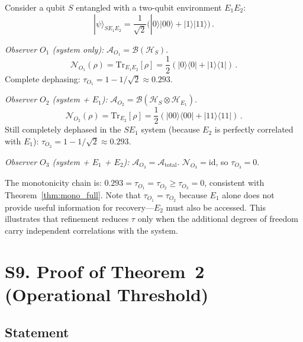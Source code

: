 \documentclass[aps,prd,preprint,superscriptaddress,longbibliography]{revtex4-2}
\newcommand{\Tr}{\mathrm{Tr}}
\newcommand{\id}{\mathrm{id}}
\newcommand{\chan}{\mathcal{N}}
\newcommand{\hilb}{\mathcal{H}}
\newcommand{\ket}[1]{|#1\rangle}
\newcommand{\op}[2]{|#1\rangle\langle#2|}
\newcommand{\tauasym}{\tau}
\newcommand{\algO}{\mathcal{A}}
\begin{document}
Consider a qubit $S$ entangled with a two-qubit environment $E_1 E_2$:
\begin{equation}
  \ket{\psi}_{S E_1 E_2} = \frac{1}{\sqrt{2}}
  \big(\ket{0}\ket{00} + \ket{1}\ket{11}\big)\,.
  \label{eq:example_state}
\end{equation}

\emph{Observer $O_1$ (system only):}
$\algO_{O_1} = \mathcal{B}(\hilb_S)$.
\begin{equation}
  \chan_{O_1}(\rho) = \Tr_{E_1 E_2}[\rho]
  = \frac{1}{2}(\op{0}{0} + \op{1}{1})\,.
  \label{eq:O1_channel}
\end{equation}
Complete dephasing: $\tauasym_{O_1} = 1 - 1/\sqrt{2} \approx 0.293$.

\emph{Observer $O_2$ (system + $E_1$):}
$\algO_{O_2} = \mathcal{B}(\hilb_S \otimes \hilb_{E_1})$.
\begin{equation}
  \chan_{O_2}(\rho) = \Tr_{E_2}[\rho]
  = \frac{1}{2}(\op{00}{00} + \op{11}{11})\,.
  \label{eq:O2_channel}
\end{equation}
Still completely dephased in the $S E_1$ system (because $E_2$ is
perfectly correlated with $E_1$):
$\tauasym_{O_2} = 1 - 1/\sqrt{2} \approx 0.293$.

\emph{Observer $O_3$ (system + $E_1$ + $E_2$):}
$\algO_{O_3} = \algO_{\mathrm{total}}$.
$\chan_{O_3} = \id$, so $\tauasym_{O_3} = 0$.

The monotonicity chain is:
$0.293 = \tauasym_{O_1} = \tauasym_{O_2} \geq \tauasym_{O_3} = 0$,
consistent with Theorem~\ref{thm:mono_full}.  Note that
$\tauasym_{O_1} = \tauasym_{O_2}$ because $E_1$ alone does not
provide useful information for recovery---$E_2$ must also be accessed.
This illustrates that refinement reduces $\tauasym$ only when the
additional degrees of freedom carry independent correlations with the
system.

\section{S9. Proof of Theorem~2 (Operational Threshold)}
\label{sec:threshold}

\subsection{Statement}
\end{document}
